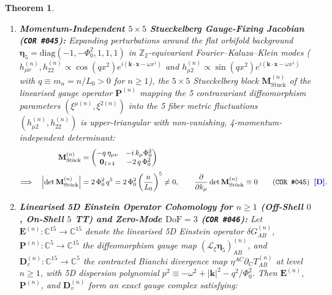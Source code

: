 \documentclass[11pt,a4paper]{article}
\newcommand{\catD}{\text{\textbf{\textcolor{blue!75!black}{[D]}}}}
\theoremstyle{definition}
\theoremstyle{plain}
\newtheorem{theorem}[axiom]{Theorem}
\theoremstyle{remark}
\begin{document}
\begin{theorem}
\begin{enumerate}[label=(\roman*)]
\begin{align}
  \end{align}
  Preserving $g_{\mu 2}^{\mathrm{proj}} = 0$ under an $x^2$-dependent shift locks $\partial_2\xi^\alpha$ to $\partial_\mu\xi^2$ via the linear constraint $\mathcal{C}_\mu[\xi] \equiv g_{\mu\alpha}\partial_2\xi^\alpha - \Phi^2\partial_\mu\xi^2 = 0$ \catD.
  \item \textbf{Momentum-Independent $5\times 5$ Stueckelberg Gauge-Fixing Jacobian (\texttt{COR~\#045}):}
  Expanding perturbations around the flat orbifold background $\bm{\eta}_5 = \mathrm{diag}(-1, -\Phi_0^2, 1, 1, 1)$ in $\mathbb{Z}_2$-equivariant Fourier--Kaluza--Klein modes ($h_{\mu\nu}^{(n)}, h_{22}^{(n)} \propto \cos(q x^2)e^{i(\mathbf{k}\cdot\mathbf{x} - \omega x^1)}$ and $h_{\mu 2}^{(n)} \propto \sin(q x^2)e^{i(\mathbf{k}\cdot\mathbf{x} - \omega x^1)}$ with $q \equiv m_n = n/L_0 > 0$ for $n \ge 1$), the $5\times 5$ Stueckelberg block $\mathbf{M}_{\mathrm{St\ddot{u}ck}}^{(n)}$ of the linearised gauge operator $\mathbf{P}^{(n)}$ mapping the 5 contravariant diffeomorphism parameters $(\xi^{\mu(n)}, \xi^{2(n)})$ into the 5 fiber metric fluctuations $(h_{\mu 2}^{(n)}, h_{22}^{(n)})$ is upper-triangular with non-vanishing, 4-momentum-independent determinant:
  \begin{align}
  \mathbf{M}_{\mathrm{St\ddot{u}ck}}^{(n)} &= \begin{pmatrix}
  -q\,\eta_{\mu\nu} & -i\,k_\mu\Phi_0^2 \\
  \mathbf{0}_{1\times 4} & -2\,q\,\Phi_0^2
  \end{pmatrix} \nonumber \\[3pt]
  \Longrightarrow \quad \left|\det\mathbf{M}_{\mathrm{St\ddot{u}ck}}^{(n)}\right| &= 2\,\Phi_0^2\,q^5 = 2\,\Phi_0^2\left(\frac{n}{L_0}\right)^5 \neq 0, \qquad
  \frac{\partial}{\partial k_\mu}\det\mathbf{M}_{\mathrm{St\ddot{u}ck}}^{(n)} \equiv 0 \qquad \textnormal{(\texttt{COR~\#045})} \;\;\catD. \label{eq:c2_stueckelberg_jacobian}
  \end{align}
  \item \textbf{Linearised 5D Einstein Operator Cohomology for $n \ge 1$ (Off-Shell $0$, On-Shell $5$ TT) and Zero-Mode $\mathrm{DoF} = 3$ (\texttt{COR~\#046}):}
  Let $\mathbf{E}^{(n)}: \mathbb{C}^{15} \to \mathbb{C}^{15}$ denote the linearised 5D Einstein operator $\delta G_{AB}^{(n)}$, $\mathbf{P}^{(n)}: \mathbb{C}^5 \to \mathbb{C}^{15}$ the diffeomorphism gauge map $(\mathcal{L}_\xi\bm{\eta}_5)_{AB}^{(n)}$, and $\mathbf{D}_v^{(n)}: \mathbb{C}^{15} \to \mathbb{C}^5$ the contracted Bianchi divergence map $\eta^{AC}\partial_C T_{AB}^{(n)}$ at level $n \ge 1$, with 5D dispersion polynomial $p^2 \equiv -\omega^2 + |\mathbf{k}|^2 - q^2/\Phi_0^2$. Then $\mathbf{E}^{(n)}$, $\mathbf{P}^{(n)}$, and $\mathbf{D}_v^{(n)}$ form an exact gauge complex satisfying:

\end{enumerate}
\end{theorem}
\end{document}
